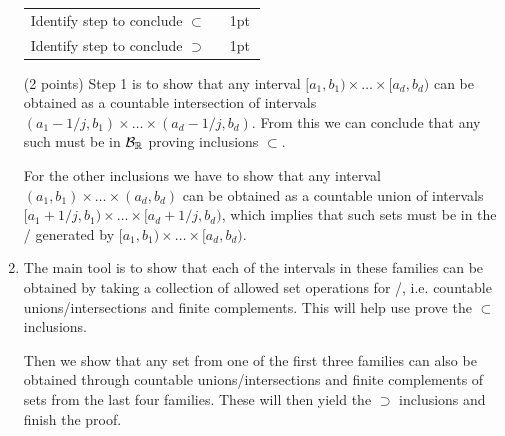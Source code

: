 \begin{enumerate}[label=(\alph*)]
{\begin{tabular}{p{0.8\linewidth}p{0.15\linewidth}}
\hline
Identify step to conclude $\subset$  & 1pt\\
Identify step to conclude $\supset$ & 1pt\\
\hline
\end{tabular}

} 

(2 points) Step 1 is to show that any interval $[a_1,b_1) \times \dots \times [a_d,b_d)$ can be obtained as a countable intersection of intervals $(a_1-1/j,b_1) \times \dots \times (a_d-1/j, b_d)$. From this we can conclude that any such must be in $\cB_\bbR$ proving inclusions $\subset$.

For the other inclusions we have to show that any interval $(a_1,b_1) \times \dots \times (a_d, b_d)$ can be obtained as a countable union of intervals $[a_1+1/j, b_1) \times \dots \times [a_d+1/j, b_d)$, which implies that such sets must be in the \sigalg/ generated by $[a_1,b_1) \times \dots \times [a_d, b_d)$. 
\item {} 
The main tool is to show that each of the intervals in these families can be obtained by taking a collection of allowed set operations for \sigalgs/, i.e. countable unions/intersections and finite complements. This will help use prove the $\subset$ inclusions. 

Then we show that any set from one of the first three families can also be obtained through countable unions/intersections and finite complements of sets from the last four families. These will then yield the $\supset$ inclusions and finish the proof.
\end{enumerate}

